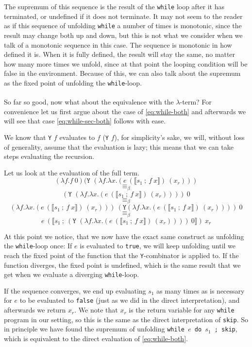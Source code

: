\documentclass[11pt, leqno, titlepage]{article}
\theoremstyle{definition}
\begin{document}
The supremum of this sequence is the result of the \texttt{while} loop after it has
terminated, or undefined if it does not terminate. It may not seem to the reader as
if this sequence of unfolding \texttt{while} a number of times is monotonic, since
the result may change both up and down, but this is not what we consider when we talk
of a monotonic sequence in this case. The sequence is monotonic in how defined it
is. When it is fully defined, the result will stay the same, no matter how many more
times we unfold, since at that point the looping condition will be false in the
environment. Because of this, we can also talk about the supremum as the fixed point
of unfolding the \texttt{while}-loop.\\
\\
So far so good, now what about the equivalence with the $\lambda$-term?
For convenience let us first argue about the case of \ref{eq:while-both} and
afterwards we will see that case \ref{eq:while-sec-both} follows with ease.

We know that \texttt{Y} $f$ evaluates to $f$ (\texttt{Y} $f$), for simplicity's sake,
we will, without loss of generality, assume that the evaluation is lazy; this means
that we can take steps evaluating the recursion.

Let us look at the evaluation of the full term.
$$(\lambda f. f~0) (\texttt{Y }(\lambda f.\lambda x.(e~(\llbracket
s_1~;~f~x\rrbracket) ~(x_r)))$$ 
$$\equiv_\beta$$
$$(\texttt{Y }(\lambda f.\lambda x.(e~(\llbracket s_1~;~f~x\rrbracket) ~(x_r))))~ 0 $$
$$\equiv_\beta$$
$$(\lambda f.\lambda x.(e~(\llbracket s_1~;~f~x\rrbracket) ~(x_r)))~(\texttt{Y
}(\lambda f.\lambda x.(e~(\llbracket s_1~;~f~x\rrbracket) ~(x_r))))~ 0 $$ 
$$\equiv_\beta$$
$$e~(\llbracket s_1~;~(\texttt{Y }(\lambda f.\lambda x.(e~(\llbracket
s_1~;~f~x\rrbracket) ~(x_r))))~0 \rrbracket) ~x_r $$

At this point we notice, that we now have the exact same construct as unfolding the
\texttt{while}-loop once: If $e$ is evaluated to \texttt{true}, we will keep
unfolding until we reach the fixed point of the function that the
\texttt{Y}-combinator is applied to. If the function diverges, the fixed point is
undefined, which is the same result that we get when we evaluate a diverging
\texttt{while}-loop.

If the sequence converges, we end up evaluating $s_1$ as many times as is necessary
for $e$ to be evaluated to \texttt{false} (just as we did in the direct
interpretation), and afterwards we return $x_r$. We note that $x_r$ is the return
variable for any \texttt{while} program in our setting, so this is the same as the
direct interpretation of \texttt{skip}. So in principle we have found the supremum of
unfolding \texttt{while $e$ do $s_1$ ; skip}, which is equivalent to the direct
evaluation of \ref{eq:while-both}.
\end{document}
